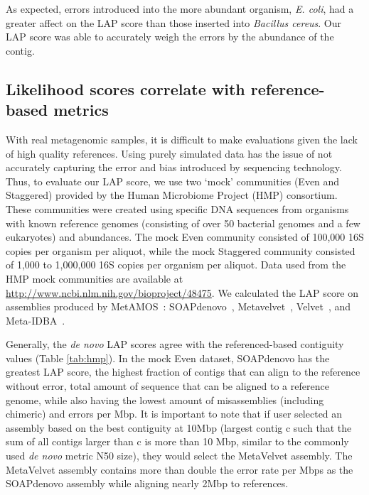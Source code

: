 \documentclass[conference]{IEEEtran}
\begin{document}
As expected, errors introduced into the more abundant organism, \emph{E. coli}, had a greater affect on the LAP score than those inserted into \emph{Bacillus cereus}.
Our LAP score was able to accurately weigh the errors by the abundance of the contig.

\subsection{Likelihood scores correlate with reference-based metrics}


With real metagenomic samples, it is difficult to make evaluations given the lack of high quality references.
Using purely simulated data has the issue of not accurately capturing the error and bias introduced by sequencing technology.
Thus, to evaluate our LAP score, we use two `mock' communities (Even and Staggered) provided by the Human Microbiome Project (HMP) consortium\cite{mitreva2012structure,methe2012framework}.
These communities were created using specific DNA sequences from organisms with known reference genomes (consisting of over 50 bacterial genomes and a few eukaryotes) and abundances.
The mock Even community consisted of 100,000 16S copies per organism per aliquot, while the mock Staggered community consisted of 1,000 to 1,000,000 16S copies per organism per aliquot.
Data used from the HMP mock communities are available at \url{http://www.ncbi.nlm.nih.gov/bioproject/48475}.
We calculated the LAP score on assemblies produced by MetAMOS~\cite{treangen2013metamos}: SOAPdenovo~\cite{SOAPdenovo}, Metavelvet~\cite{namiki2012metavelvet}, Velvet~\cite{Velvet}, and Meta-IDBA~\cite{peng2011meta}.

Generally, the \emph{de novo} LAP scores agree with the referenced-based contiguity values (Table \ref{tab:hmp}).
In the mock Even dataset, SOAPdenovo has the greatest LAP score, the highest fraction of contigs that can align to the reference without error, total amount of sequence that can be aligned to a reference genome, while also having the lowest amount of misassemblies (including chimeric) and errors per Mbp.
It is important to note that if user selected an assembly based on the best contiguity at 10Mbp (largest contig c such that the sum of all contigs larger than c is more than 10 Mbp, similar to the commonly used \emph{de novo} metric N50 size), they would select the MetaVelvet assembly.
The MetaVelvet assembly contains more than double the error rate per Mbps as the SOAPdenovo assembly while aligning nearly 2Mbp to references.
\end{document}
